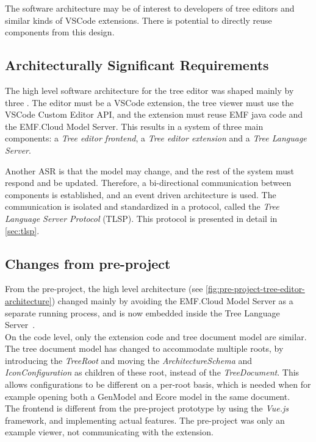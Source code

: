 The software architecture may be of interest to developers of tree editors and similar kinds of \gls{VSCode} extensions.
There is potential to directly reuse components from this design.

\subsection{Architecturally Significant Requirements}
The high level software architecture for the tree editor was shaped mainly by three .
The editor must be a \gls{VSCode} extension, the tree viewer must use the \gls{VSCode} Custom Editor \gls{API}, and the extension must reuse \acrshort{EMF} java code and the EMF.Cloud Model Server.
This results in a system of three main components: a \textit{Tree editor frontend}, a \textit{Tree editor extension} and a \textit{Tree Language Server}.

Another \acrshort{ASR} is that the model may change, and the rest of the system must respond and be updated.
Therefore, a bi-directional communication between components is established, and an event driven architecture is used.
The communication is isolated and standardized in a protocol, called the \textit{Tree Language Server Protocol} (\acrshort{TLSP}).
This protocol is presented in detail in \cref{sec:tlsp}.


\subsection{Changes from pre-project}
From the pre-project, the high level architecture (see \cref{fig:pre-project-tree-editor-architecture}) changed mainly by avoiding the EMF.Cloud Model Server as a separate running process, and is now embedded inside the Tree Language Server~\cite[p.~49]{rekstadModelingEnvironmentCloud2020}.\\

On the code level, only the extension code and tree document model are similar.
The tree document model has changed to accommodate multiple roots, by introducing the \textit{TreeRoot} and moving the \textit{ArchitectureSchema} and \textit{IconConfiguration} as children of these root, instead of the \textit{TreeDocument}.
This allows configurations to be different on a per-root basis, which is needed when for example opening both a GenModel and \gls{Ecore} model in the same document.\\

The frontend is different from the pre-project prototype by using the \textit{Vue.js} framework, and implementing actual features.
The pre-project was only an example viewer, not communicating with the extension.\\

